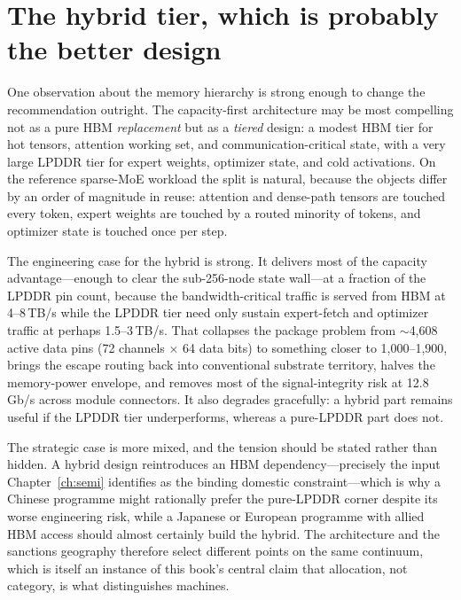 \section{The hybrid tier, which is probably the better design}
\label{sec:hybrid}

One observation about the memory hierarchy is strong enough to change the recommendation outright. The capacity-first architecture may be most compelling not as a pure HBM \emph{replacement} but as a \emph{tiered} design: a modest HBM tier for hot tensors, attention working set, and communication-critical state, with a very large LPDDR tier for expert weights, optimizer state, and cold activations. On the reference sparse-MoE workload the split is natural, because the objects differ by an order of magnitude in reuse: attention and dense-path tensors are touched every token, expert weights are touched by a routed minority of tokens, and optimizer state is touched once per step.

The engineering case for the hybrid is strong. It delivers most of the capacity advantage---enough to clear the sub-256-node state wall---at a fraction of the LPDDR pin count, because the bandwidth-critical traffic is served from HBM at 4--8\,TB/s while the LPDDR tier need only sustain expert-fetch and optimizer traffic at perhaps 1.5--3\,TB/s. That collapses the package problem from $\sim$4,608 active data pins (72 channels $\times$ 64 data bits) to something closer to 1,000--1,900, brings the escape routing back into conventional substrate territory, halves the memory-power envelope, and removes most of the signal-integrity risk at 12.8\,Gb/s across module connectors. It also degrades gracefully: a hybrid part remains useful if the LPDDR tier underperforms, whereas a pure-LPDDR part does not.

The strategic case is more mixed, and the tension should be stated rather than hidden. A hybrid design reintroduces an HBM dependency---precisely the input Chapter~\ref{ch:semi} identifies as the binding domestic constraint---which is why a Chinese programme might rationally prefer the pure-LPDDR corner despite its worse engineering risk, while a Japanese or European programme with allied HBM access should almost certainly build the hybrid. The architecture and the sanctions geography therefore select different points on the same continuum, which is itself an instance of this book's central claim that allocation, not category, is what distinguishes machines.

